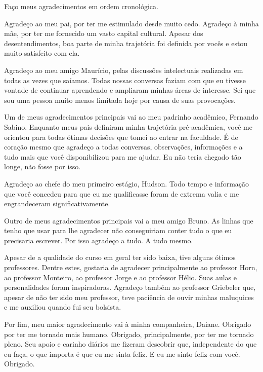 \documentclass[
	12pt,				%
	openright,			%
	twoside,			%
	a4paper,			%
	english,			%
	french,				%
	spanish,			%
	brazil				%
	]{abntex2}
\begin{document}
\begin{agradecimentos}

Faço meus agradecimentos em ordem cronológica.

Agradeço ao meu pai, por ter me estimulado desde muito cedo.
Agradeço à minha mãe, por ter me fornecido um vasto capital cultural.
Apesar dos desentendimentos, boa parte de minha trajetória foi definida por
vocês e estou muito satisfeito com ela.

Agradeço ao meu amigo Maurício, pelas discussões intelectuais realizadas em todas as vezes
que saíamos. Todas nossas conversas faziam com que eu tivesse vontade de continuar aprendendo
e ampliaram minhas áreas de interesse. Sei que sou uma pessoa muito menos limitada
hoje por causa de suas provocações.

Um de meus agradecimentos principais vai ao meu padrinho acadêmico, Fernando Sabino.
Enquanto meus pais definiram minha trajetória pré-acadêmica, você me orientou
para todas ótimas decisões que tomei ao entrar na faculdade. É de coração mesmo
que agradeço a todas conversas, observações, informações e a tudo mais que você
disponibilizou para me ajudar. Eu não teria chegado tão longe, não fosse por isso.

Agradeço ao chefe do meu primeiro estágio, Hudson. Todo tempo e informação que você
concedeu para que eu me qualificasse foram de extrema valia e me engrandeceram
significativamente.

Outro de meus agradecimentos principais vai a meu amigo Bruno. As linhas que
tenho que usar para lhe agradecer não conseguiriam conter tudo o que eu precisaria escrever.
Por isso agradeço a tudo. A tudo mesmo.

Apesar de a qualidade do curso em geral ter sido baixa, tive alguns
ótimos professores. Dentre estes, gostaria de agradecer principalmente ao professor Horn,
ao professor Monteiro, ao professor Jorge e ao professor Hélio. Suas aulas e personalidades
foram inspiradoras. Agradeço também ao professor Griebeler que, apesar de não ter sido
meu professor, teve paciência de ouvir minhas maluquices e me auxiliou quando
fui seu bolsista.

Por fim, meu maior agradecimento vai à minha companheira, Daiane.
Obrigado por ter me tornado mais humano. Obrigado, principalmente,
por ter me tornado pleno. Seu apoio e carinho diários me fizeram descobrir que,
independente do que eu faça, o que importa é que eu me sinta feliz. E eu me sinto
feliz com você. Obrigado.

\end{agradecimentos}
\end{document}
